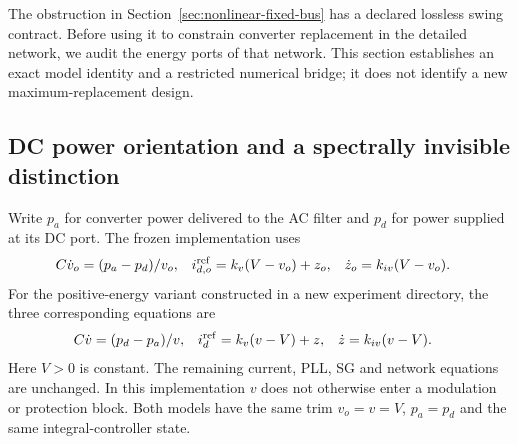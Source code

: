 \documentclass[11pt]{article}
\begin{document}
The obstruction in Section~\ref{sec:nonlinear-fixed-bus} has a declared
lossless swing contract. Before using it to constrain converter replacement
in the detailed network, we audit the energy ports of that network. This
section establishes an exact model identity and a restricted numerical
bridge; it does not identify a new maximum-replacement design.

\subsection{DC power orientation and a spectrally invisible distinction}
Write $p_a$ for converter power delivered to the AC filter and $p_d$ for
power supplied at its DC port. The frozen implementation uses
\begin{align}
 C\dot v_o&=(p_a-p_d)/v_o,&
 i_{d,o}^{\rm ref}&=k_v(V-v_o)+z_o,&
 \dot z_o&=k_{iv}(V-v_o).\label{eq:legacy-dc-bridge}
\end{align}
For the positive-energy variant constructed in a new experiment directory,
the three corresponding equations are
\begin{align}
 C\dot v&=(p_d-p_a)/v,&
 i_d^{\rm ref}&=k_v(v-V)+z,&
 \dot z&=k_{iv}(v-V).\label{eq:physical-dc-bridge}
\end{align}
Here $V>0$ is constant. The remaining current, PLL, SG and network equations
are unchanged. In this implementation $v$ does not otherwise enter a
modulation or protection block. Both models have the same trim
$v_o=v=V$, $p_a=p_d$ and the same integral-controller state.
\end{document}
